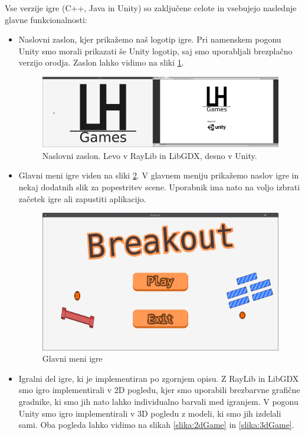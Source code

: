 \documentclass[12pt,a4paper,twoside]{book}
\begin{document}
Vse verzije igre (C++, Java in Unity) so zaključene celote in vsebujejo naslednje glavne funkcionalnosti:
\begin{itemize}
\item Naslovni zaslon, kjer prikažemo naš logotip igre. Pri namenskem pogonu Unity smo morali prikazati še Unity logotip, saj smo uporabljali brezplačno verzijo orodja. Zaslon lahko vidimo na sliki \ref{slika:naslovniZaslon}.
\begin{figure}[h]
	\centering
	\includegraphics[width=14cm]{titleScreen}
	\caption{Naslovni zaslon. Levo v RayLib in LibGDX, desno v Unity.}
	\label{slika:naslovniZaslon}
\end{figure}
\item Glavni meni igre viden na sliki \ref{slika:mainMenu}. V glavnem meniju prikažemo naslov igre in nekaj dodatnih slik za popestritev scene. Uporabnik ima nato na voljo izbrati začetek igre ali zapustiti aplikacijo.
\begin{figure}[h]
	\centering
	\includegraphics[width=14cm]{mainMenu}
	\caption{Glavni meni igre}
	\label{slika:mainMenu}
\end{figure}
\item Igralni del igre, ki je implementiran po zgornjem opisu. Z RayLib in LibGDX smo igro implementirali v 2D pogledu, kjer smo uporabili brezbarvne grafične gradnike, ki smo jih nato lahko individualno barvali med igranjem. V pogonu Unity  smo igro implementirali v 3D pogledu z modeli, ki smo jih izdelali sami. Oba pogleda lahko vidimo na slikah \ref{slika:2dGame} in \ref{slika:3dGame}.

\end{itemize}
\end{document}
